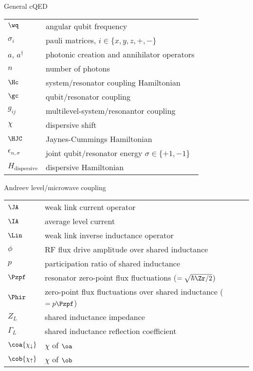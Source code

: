 {\Large\noindent General cQED}
\vspace{-.2cm}
\begin{longtable}{ m{5em} m{29em}}
$\wq$ & angular qubit frequency \\
$\sigma_i$ & pauli matrices, $i \in \{ x,y,z,+,-\}$ \\
$a$, $a^\dagger$ & photonic creation and annihilator operators \\
$n$ & number of photons \\
$\Hc$ & system/resonator coupling Hamiltonian \\
$\gc$ & qubit/resonator coupling \\
$g_{ij}$ & multilevel-system/resonantor coupling \\
$\chi$ & dispersive shift \\
$\HJC$ & Jaynes-Cummings Hamiltonian \\
$\epsilon_{n,\sigma}$ & joint qubit/resonator energy $\sigma \in \{+1, -1\}$ \\
$H_\mathrm{dispersive}$ & dispersive Hamiltonian \\
\end{longtable}
\vspace{.2cm}

{\Large\noindent Andreev level/microwave coupling}
\vspace{-.2cm}
\begin{longtable}{ m{5em} m{29em}}
$\JA$ & weak link current operator\\
$\IA$ & average level current \\
$\Lin$ & weak link inverse inductance operator\\
$\phi$ & RF flux drive amplitude over shared inductance \\
$p$ & participation ratio of shared inductance \\
$\Pzpf$ & resonator zero-point flux fluctuations ($=\sqrt{\hbar \Zr/2}$) \\
$\Phir$ & zero-point flux fluctuations over shared inductance ($=p \Pzpf$) \\
$Z_L$ & shared inductance impedance \\
$\Gamma_L$ & shared inductance reflection coefficient \\
$\coa{\chi_\downarrow}$ & $\chi$ of $\oa$ \\
$\cob{\chi_\uparrow}$ & $\chi$ of $\ob$ \\
\end{longtable}
\vspace{.2cm}

